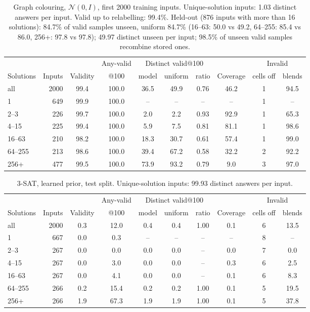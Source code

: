 \documentclass[11pt]{article}
\begin{document}
\begin{table}[H]
\centering\small
\begin{tabular}{@{}lrcccccccc@{}}
\toprule
& & & Any-valid & \multicolumn{3}{c}{Distinct valid@100} & & \multicolumn{2}{c}{Invalid} \\
\cmidrule(lr){5-7}\cmidrule(l){9-10}
Solutions & Inputs & Validity & @100 & model & uniform & ratio & Coverage & cells off & blends \\
\midrule
all & 2000 & 99.4 & 100.0 & 36.5 & 49.9 & 0.76 & 46.2 & 1 & 94.5 \\
1 & 649 & 99.9 & 100.0 & -- & -- & -- & -- & 1 & -- \\
2--3 & 226 & 99.7 & 100.0 & 2.0 & 2.2 & 0.93 & 92.9 & 1 & 65.3 \\
4--15 & 225 & 99.4 & 100.0 & 5.9 & 7.5 & 0.81 & 81.1 & 1 & 98.6 \\
16--63 & 210 & 98.2 & 100.0 & 18.3 & 30.7 & 0.61 & 57.4 & 1 & 99.0 \\
64--255 & 213 & 98.6 & 100.0 & 39.4 & 67.2 & 0.58 & 32.2 & 2 & 92.2 \\
256+ & 477 & 99.5 & 100.0 & 73.9 & 93.2 & 0.79 & 9.0 & 3 & 97.0 \\
\bottomrule
\end{tabular}
\caption{Graph colouring, $\mathcal{N}(0,I)$, first 2000 training inputs. Unique-solution inputs: 1.03 distinct answers per input. Valid up to relabelling: 99.4\%. Held-out (876 inputs with more than 16 solutions): 84.7\% of valid samples unseen, uniform 84.7\% (16--63: 50.0 vs 49.2, 64--255: 85.4 vs 86.0, 256+: 97.8 vs 97.8); 49.97 distinct unseen per input; 98.5\% of unseen valid samples recombine stored ones.}
\end{table}

\begin{table}[H]
\centering\small
\begin{tabular}{@{}lrcccccccc@{}}
\toprule
& & & Any-valid & \multicolumn{3}{c}{Distinct valid@100} & & \multicolumn{2}{c}{Invalid} \\
\cmidrule(lr){5-7}\cmidrule(l){9-10}
Solutions & Inputs & Validity & @100 & model & uniform & ratio & Coverage & cells off & blends \\
\midrule
all & 2000 & 0.3 & 12.0 & 0.4 & 0.4 & 1.00 & 0.1 & 6 & 13.5 \\
1 & 667 & 0.0 & 0.3 & -- & -- & -- & -- & 8 & -- \\
2--3 & 267 & 0.0 & 0.0 & 0.0 & 0.0 & -- & 0.0 & 7 & 0.0 \\
4--15 & 267 & 0.0 & 3.0 & 0.0 & 0.0 & -- & 0.3 & 6 & 2.5 \\
16--63 & 267 & 0.0 & 4.1 & 0.0 & 0.0 & -- & 0.1 & 6 & 8.3 \\
64--255 & 266 & 0.2 & 15.4 & 0.2 & 0.2 & 1.00 & 0.1 & 5 & 19.5 \\
256+ & 266 & 1.9 & 67.3 & 1.9 & 1.9 & 1.00 & 0.1 & 5 & 37.8 \\
\bottomrule
\end{tabular}
\caption{3-SAT, learned prior, test split. Unique-solution inputs: 99.93 distinct answers per input.}
\end{table}
\end{document}
